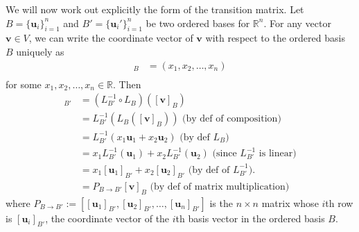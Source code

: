\documentclass[12pt,letterpaper,reqno]{article}
\numberwithin{equation}{section}
\newcommand{\R}{\ensuremath{\mathbb R}}
\newcommand{\bv}{\mathbf{v}}
\newcommand{\bu}{\mathbf{u}}
\begin{document}
We will now work out explicitly the form of the transition matrix. Let $B=\{\bu_i\}_{i=1}^n$ and $B'=\{\bu_i'\}_{i=1}^n$ be two ordered bases for $\R^n$. For any vector $\bv \in V$, we can write the coordinate vector of $\bv$ with respect to the ordered basis $B$ uniquely as 
\begin{align*}
	[\bv]_B&=(x_1,x_2,\dots,x_n) \\ 
\end{align*}
for some $x_1,x_2,\dots,x_n \in \R$. Then
\begin{align*}
	[\bv]_{B'}&=(L_{B'}^{-1} \circ L_B)([\bv]_B) \\
	&=L_{B'}^{-1}(L_B([\bv]_B)) \text{ (by def of composition)}\\
	&=L_{B'}^{-1}(x_1\bu_1+x_2\bu_2) \text{ (by def $L_B$)} \\
	&=x_1L_{B'}^{-1}(\bu_1)+x_2L_{B'}^{-1}(\bu_2) \text{ (since $L_{B'}^{-1}$ is linear)} \\
	&=x_1[\bu_1]_{B'}+x_2[\bu_2]_{B'} \text{ (by def of $L_{B'}^{-1}$).} \\
	&=P_{B \to B'}[\bv]_{B} \text{ (by def of matrix multiplication)}
\end{align*}	
where $P_{B \to B'}:=[[\bu_1]_{B'}, [\bu_2]_{B'},\dots,[\bu_n]_{B'}]$ is the $n \times n$ matrix whose $i$th row is $[\bu_i]_{B'}$, the coordinate vector of the $i$th basis vector in the ordered basis $B$.
\end{document}
